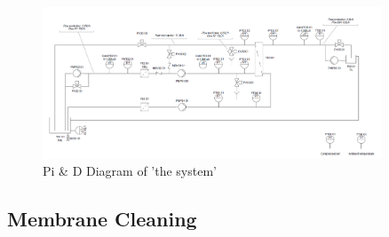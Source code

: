
\begin{figure}[h]
    \centering
    \includegraphics[width=0.9\textwidth]{Billeder/exp/PID.png}
    \caption{Pi \& D Diagram of 'the system'}
    \label{fig:PID_system}
\end{figure}











\subsection{Membrane Cleaning}


